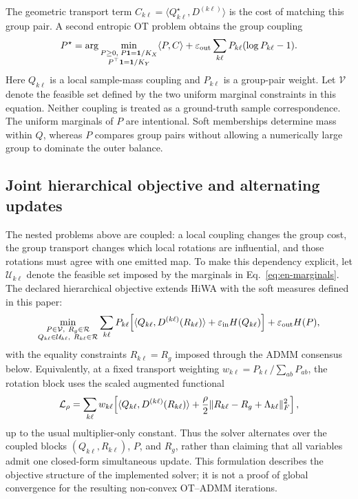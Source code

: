 \documentclass[10pt,a4paper]{article}
\begin{document}
The geometric transport term $C_{k\ell}=\langle Q_{k\ell}^\star,D^{(k\ell)}\rangle$ is the cost of matching this group pair. A second entropic OT problem obtains the group coupling
\begin{equation}
P^\star=\arg\min_{\substack{P\ge0,\;P\mathbf1=\mathbf1/K_X\\P^\top\mathbf1=\mathbf1/K_Y}}
\langle P,C\rangle+\varepsilon_{\rm out}\sum_{k\ell}P_{k\ell}(\log P_{k\ell}-1).
\label{eq:en-outer}
\end{equation}
Here $Q_{k\ell}$ is a local sample-mass coupling and $P_{k\ell}$ is a group-pair weight. Let $\mathcal V$ denote the feasible set defined by the two uniform marginal constraints in this equation. Neither coupling is treated as a ground-truth sample correspondence. The uniform marginals of $P$ are intentional. Soft memberships determine mass within $Q$, whereas $P$ compares group pairs without allowing a numerically large group to dominate the outer balance.

\subsection{Joint hierarchical objective and alternating updates}
The nested problems above are coupled: a local coupling changes the group cost, the group transport changes which local rotations are influential, and those rotations must agree with one emitted map. To make this dependency explicit, let $\mathcal U_{k\ell}$ denote the feasible set imposed by the marginals in Eq.~\ref{eq:en-marginals}. The declared hierarchical objective extends HiWA with the soft measures defined in this paper:
\begin{equation}
\min_{\substack{P\in\mathcal V,\ R_g\in\mathcal R\\ Q_{k\ell}\in\mathcal U_{k\ell},\ R_{k\ell}\in\mathcal R}}
\sum_{k\ell}P_{k\ell}\!\left[\langle Q_{k\ell},D^{(k\ell)}(R_{k\ell})\rangle+\varepsilon_{\rm in}H(Q_{k\ell})\right]
+\varepsilon_{\rm out}H(P),
\label{eq:en-joint-hot}
\end{equation}
with the equality constraints $R_{k\ell}=R_g$ imposed through the ADMM consensus below. Equivalently, at a fixed transport weighting $w_{k\ell}=P_{k\ell}/\sum_{ab}P_{ab}$, the rotation block uses the scaled augmented functional
\begin{equation}
\mathcal L_\rho=\sum_{k\ell}w_{k\ell}\!\left[\langle Q_{k\ell},D^{(k\ell)}(R_{k\ell})\rangle+\frac{\rho}{2}\lVert R_{k\ell}-R_g+\Lambda_{k\ell}\rVert_F^2\right],
\label{eq:en-augmented}
\end{equation}
up to the usual multiplier-only constant. Thus the solver alternates over the coupled blocks $(Q_{k\ell},R_{k\ell})$, $P$, and $R_g$, rather than claiming that all variables admit one closed-form simultaneous update. This formulation describes the objective structure of the implemented solver; it is not a proof of global convergence for the resulting non-convex OT--ADMM iterations.
\end{document}
